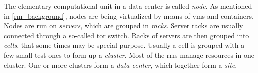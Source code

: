 
The elementary computational unit in a data center is called \textit{node}.
As mentioned in \autoref{rm_background}, nodes are being virtualized by means of \glspl{vm} and containers.
Nodes are run on \textit{servers}, which are grouped in \textit{racks}.
Server racks are usually connected through a so-called \gls{tor} switch.
Racks of servers are then grouped into \textit{cells}, that some times may be special-purpose.
Usually a cell is grouped with a few small test ones to form up a \textit{cluster}.
Most of the \glspl{rm} manage resources in one cluster.
One or more clusters form a \textit{data center}, which together form a \textit{site}.